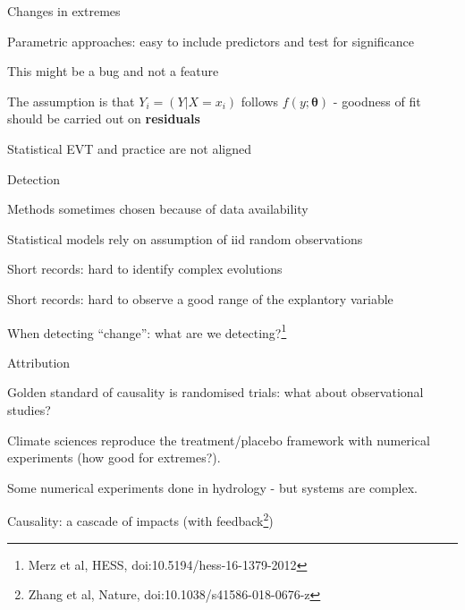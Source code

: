 \documentclass[
  10pt,
  ignorenonframetext,
  compress]{beamer}
\begin{document}
\begin{frame}{Changes in extremes}
\protect\hypertarget{changes-in-extremes}{}

Parametric approaches: easy to include predictors and test for
significance

\pause

This might be a bug and not a feature

\pause

The assumption is that \(Y_i=(Y|X = x_i)\) follows
\(f(y; \boldsymbol \theta)\) - goodness of fit should be carried out on
\textbf{residuals}

Statistical EVT and practice are not aligned

\end{frame}

\begin{frame}{Detection}
\protect\hypertarget{detection}{}

Methods sometimes chosen because of data availability

Statistical models rely on assumption of iid random observations

Short records: hard to identify complex evolutions

Short records: hard to observe a good range of the explantory variable

When detecting ``change'': what are we
detecting?\footnote{Merz et al, HESS, doi:10.5194/hess-16-1379-2012}

\end{frame}

\begin{frame}{Attribution}
\protect\hypertarget{attribution}{}

Golden standard of causality is randomised trials: what about
observational studies?

Climate sciences reproduce the treatment/placebo framework with
numerical experiments (how good for extremes?).

Some numerical experiments done in hydrology - but systems are complex.

Causality: a cascade of impacts (with
feedback\footnote{Zhang et al, Nature, doi:10.1038/s41586-018-0676-z})

\end{frame}
\end{document}
